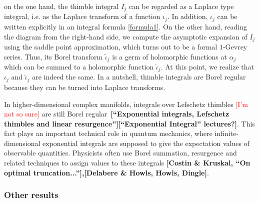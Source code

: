 \documentclass{article}
\theoremstyle{definition}
\newcommand{\maps}{\colon}
\newcommand{\R}{\mathbb{R}}
\newcommand{\series}[1]{\tilde{#1}}
\begin{document}
on the one hand, the thimble integral $I_j$ can be regarded as a Laplace type integral, i.e. as the Laplace transform of a function $\iota_j$. In addition, $\iota_j$ can be written explicitly in an integral formula \eqref{formula1}. 
On the other hand, reading the diagram from the right-hand side, we compute the asymptotic expansion of $I_j$ using the saddle point approximation, which turns out to be a formal $1$-Gevrey series. Thus, its Borel transform $\series{\iota}_j$ is a germ of holomorphic functions at $\alpha_j$ which can be summed to a holomorphic function $\hat{\iota}_j$. At this point, we realize that $\iota_j$ and $\hat{\iota}_j$ are indeed the same. In a nutshell, thimble integrals are Borel regular because they can be turned into Laplace transforms.      


In higher-dimensional complex manifolds, integrals over Lefschetz thimbles \textcolor{red}{[I'm not so sure]} are still Borel regular~\textbf{[``Exponential integrals, Lefschetz thimbles and linear resurgence''][``Exponential Integral'' lectures?]}. This fact plays an important technical role in quantum mechanics, where infinite-dimensional exponential integrals are supposed to give the expectation values of observable quantities. Physicists often use Borel summation, resurgence and related techniques to assign values to these integrals \textbf{[Costin \& Kruskal, ``On optimal truncation...''],\cite{delabaere-howls,dingle1973asymptotic}[Delabere \& Howls, Howls, Dingle]}.





\subsubsection{Other results}
\end{document}
